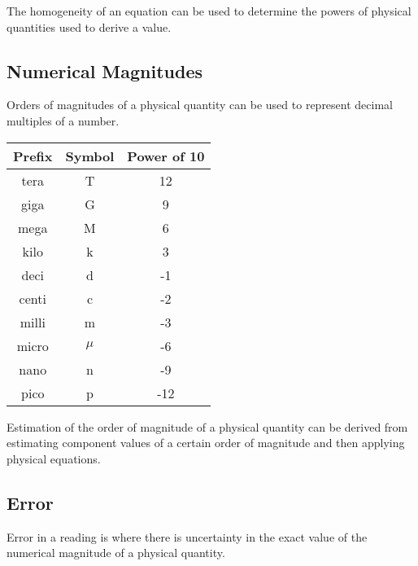 \documentclass[../main]{subfiles}
\begin{document}
	The homogeneity of an equation can be used to determine the powers of physical quantities used to derive a value.

	\subsection{Numerical Magnitudes}

	Orders of magnitudes of a physical quantity can be used to represent decimal multiples of a number.

	\begin{center} \begin{tabular}{|c|c|c|} \hline
	\bf{Prefix}	&	\bf{Symbol}	&	\bf{Power of 10} \\ \hline
	tera 	&	T 	&	12	\\ \hline
	giga 	&	G 	&	9	\\ \hline
	mega 	&	M 	&	6	\\ \hline
	kilo	&	k 	&	3	\\ \hline
	deci	&	d 	&	-1	\\ \hline
	centi	&	c 	&	-2	\\ \hline
	milli	&	m 	&	-3	\\ \hline
	micro	&	\(\mu\) &	-6	\\ \hline	
	nano	&	n 	&	-9	\\ \hline
	pico 	&	p 	&	-12	\\ \hline
	\end{tabular} \end{center}


	Estimation of the order of magnitude of a physical quantity can be derived from estimating component values of a certain order of magnitude and then applying physical equations.

	\subsection{Error}

	Error in a reading is where there is uncertainty in the exact value of the numerical magnitude of a physical quantity.

\end{document}
